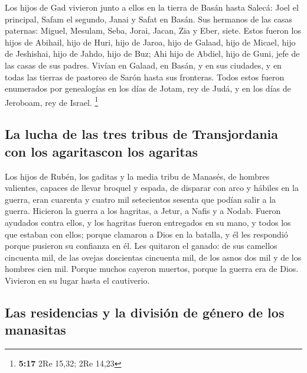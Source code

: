  Los hijos de Gad vivieron junto a ellos en la tierra de
Basán hasta Salecá:  Joel el principal, Safam el segundo,
Janai y Safat en Basán.  Sus hermanos de las casas
paternas: Miguel, Mesulam, Seba, Jorai, Jacan, Zia y Eber, siete.
 Estos fueron los hijos de Abihail, hijo de Huri, hijo de
Jaroa, hijo de Galaad, hijo de Micael, hijo de Jeshishai, hijo de Jahdo,
hijo de Buz;  Ahi hijo de Abdiel, hijo de Guni, jefe de
las casas de sus padres.  Vivían en Galaad, en Basán, y
en sus ciudades, y en todas las tierras de pastoreo de Sarón hasta sus
fronteras.  Todos estos fueron enumerados por genealogías
en los días de Jotam, rey de Judá, y en los días de Jeroboam, rey de
Israel. \footnote{\textbf{5:17} 2Re 15,32; 2Re 14,23}

\hypertarget{la-lucha-de-las-tres-tribus-de-transjordania-con-los-agaritascon-los-agaritas}{%
\subsection{La lucha de las tres tribus de Transjordania con los
agaritascon los
agaritas}\label{la-lucha-de-las-tres-tribus-de-transjordania-con-los-agaritascon-los-agaritas}}

 Los hijos de Rubén, los gaditas y la media tribu de
Manasés, de hombres valientes, capaces de llevar broquel y espada, de
disparar con arco y hábiles en la guerra, eran cuarenta y cuatro mil
setecientos sesenta que podían salir a la guerra. 
Hicieron la guerra a los hagritas, a Jetur, a Nafis y a Nodab.
 Fueron ayudados contra ellos, y los hagritas fueron
entregados en su mano, y todos los que estaban con ellos; porque
clamaron a Dios en la batalla, y él les respondió porque pusieron su
confianza en él.  Les quitaron el ganado: de sus camellos
cincuenta mil, de las ovejas doscientas cincuenta mil, de los asnos dos
mil y de los hombres cien mil.  Porque muchos cayeron
muertos, porque la guerra era de Dios. Vivieron en su lugar hasta el
cautiverio.

\hypertarget{las-residencias-y-la-divisiuxf3n-de-guxe9nero-de-los-manasitas}{%
\subsection{Las residencias y la división de género de los
manasitas}\label{las-residencias-y-la-divisiuxf3n-de-guxe9nero-de-los-manasitas}}

